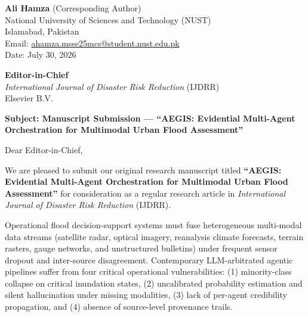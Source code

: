 \documentclass[11pt,a4paper]{article}
\begin{document}
\thispagestyle{empty}

\begin{flushleft}
\textbf{Ali Hamza} (Corresponding Author) \\
National University of Sciences and Technology (NUST) \\
Islamabad, Pakistan \\
Email: \href{mailto:ahamza.msse25mcs@student.nust.edu.pk}{ahamza.msse25mcs@student.nust.edu.pk} \\
Date: July 30, 2026
\end{flushleft}

\vspace{1.2em}

\begin{flushleft}
\textbf{Editor-in-Chief} \\
\textit{International Journal of Disaster Risk Reduction} (IJDRR) \\
Elsevier B.V.
\end{flushleft}

\vspace{1.2em}

\noindent \textbf{Subject: Manuscript Submission — ``AEGIS: Evidential Multi-Agent Orchestration for Multimodal Urban Flood Assessment''}

\vspace{0.8em}

\noindent Dear Editor-in-Chief,

\vspace{0.6em}

\noindent We are pleased to submit our original research manuscript titled \textbf{``AEGIS: Evidential Multi-Agent Orchestration for Multimodal Urban Flood Assessment''} for consideration as a regular research article in \textit{International Journal of Disaster Risk Reduction} (IJDRR).

\vspace{0.6em}

\noindent Operational flood decision-support systems must fuse heterogeneous multi-modal data streams (satellite radar, optical imagery, reanalysis climate forecasts, terrain rasters, gauge networks, and unstructured bulletins) under frequent sensor dropout and inter-source disagreement. Contemporary LLM-arbitrated agentic pipelines suffer from four critical operational vulnerabilities: (1) minority-class collapse on critical inundation states, (2) uncalibrated probability estimation and silent hallucination under missing modalities, (3) lack of per-agent credibility propagation, and (4) absence of source-level provenance trails.
\end{document}
